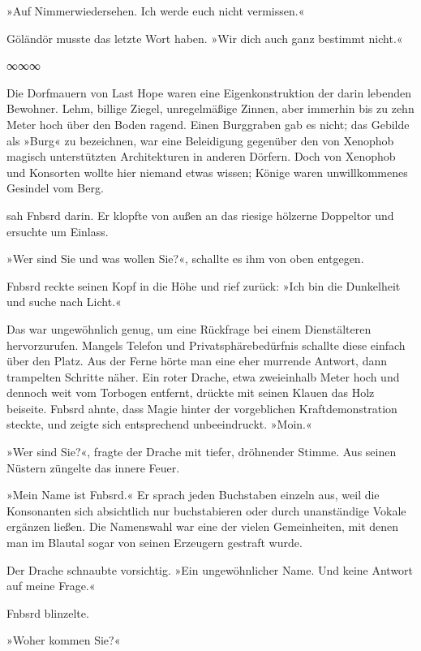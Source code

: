 »Auf Nimmerwiedersehen. Ich werde euch nicht vermissen.«

Göländör musste das letzte Wort haben. »Wir dich auch ganz bestimmt nicht.«

\begin{center}
∞∞∞
\end{center}

Die Dorfmauern von Last Hope waren eine Eigenkonstruktion der darin lebenden Bewohner. Lehm, billige Ziegel, unregelmäßige Zinnen, aber immerhin bis zu zehn Meter hoch über den Boden ragend. Einen Burggraben gab es nicht; das Gebilde als »Burg« zu bezeichnen, war eine Beleidigung gegenüber den von Xenophob magisch unterstützten Architekturen in anderen Dörfern. Doch von Xenophob und Konsorten wollte hier niemand etwas wissen; Könige waren unwillkommenes Gesindel vom Berg.

 sah Fnbsrd darin. Er klopfte von außen an das riesige hölzerne Doppeltor und ersuchte um Einlass.

»Wer sind Sie und was wollen Sie?«, schallte es ihm von oben entgegen.

Fnbsrd reckte seinen Kopf in die Höhe und rief zurück: »Ich bin die Dunkelheit und suche nach Licht.«

Das war ungewöhnlich genug, um eine Rückfrage bei einem Dienstälteren hervorzurufen. Mangels Telefon und Privatsphärebedürfnis schallte diese einfach über den Platz. Aus der Ferne hörte man eine eher murrende Antwort, dann trampelten Schritte näher. Ein roter Drache, etwa zweieinhalb Meter hoch und dennoch weit vom Torbogen entfernt, drückte mit seinen Klauen das Holz beiseite. Fnbsrd ahnte, dass Magie hinter der vorgeblichen Kraftdemonstration steckte, und zeigte sich entsprechend unbeeindruckt. »Moin.«

»Wer sind Sie?«, fragte der Drache mit tiefer, dröhnender Stimme. Aus seinen Nüstern züngelte das innere Feuer.

»Mein Name ist Fnbsrd.« Er sprach jeden Buchstaben einzeln aus, weil die Konsonanten sich absichtlich nur buchstabieren oder durch unanständige Vokale ergänzen ließen. Die Namenswahl war eine der vielen Gemeinheiten, mit denen man im Blautal sogar von seinen Erzeugern gestraft wurde.

Der Drache schnaubte vorsichtig. »Ein ungewöhnlicher Name. Und keine Antwort auf meine Frage.«

Fnbsrd blinzelte.

»Woher kommen Sie?«

